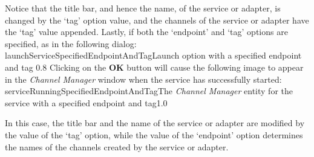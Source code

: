 Notice that the title bar, and hence the name, of the service or adapter, is changed by
the `tag' option value, and the channels of the service or adapter have the `tag' value
appended.
Lastly, if both the `endpoint' and `tag' options are specified, as in the following
dialog:
%
{launchServiceSpecifiedEndpointAndTag}{Launch option with a specified endpoint and tag}%
{0.8}
\condPage{}
Clicking on the \textbf{OK} button will cause the following image to appear in the
\emph{Channel Manager} window when the service has successfully started:
%
{serviceRunningSpecifiedEndpointAndTag}{The \emph{Channel Manager} entity for the service
with a specified endpoint and tag}{1.0}

In this case, the title bar and the name of the service or adapter are modified by the
value of the `tag' option, while the value of the `endpoint' option determines the names
of the \yarp{} channels created by the service or adapter.
\appendixEnd{}
